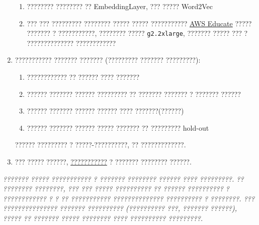 \documentclass[a4paper, 12pt]{article}
\begin{document}
\begin{enumerate}
\begin{enumerate}
            \item ???????? ???????? ?? EmbeddingLayer, ??? ????? Word2Vec
			\item ??? ??? ????????? ???????? ????? ????? ??????????? \href{https://aws.amazon.com/ru/education/awseducate/}{AWS Educate} ????? ??????? ? ???????????, ???????? ????? \texttt{g2.2xlarge}, ??????? ????? ??? ? ?????????????? ????????????
        \end{enumerate} 
        \item ??????????? ??????? ??????? (????????? ??????? ?????????):
        \begin{enumerate}
			\item ???????????? ?? ?????? ???? ???????
            \item ?????? ??????? ?????? ????????? ?? ??????? ??????? ? ??????? ??????
            \item ?????? ??????? ?????? ?????? ???? ???????(??????)
            \item ?????? ??????? ?????? ????? ??????? ?? ????????? hold-out
\end{enumerate}
?????? ????????? ? ?????-??????????, ?? ?????????????.
\item ??? ????? ??????, \href{http://www.slideshare.net/antongorokhov/bigdata-week-moscow-2013-case-personalization}{???????????} ? ??????? ???????? ??????. 
  \end{enumerate}
  
\vspace{1.2cm}
\emph{??????? ????? ??????????? ? ??????? ???????? ?????? ???? ?????????. ?? ???????? ????????, ??? ??? ????? ?????????? ?? ?????? ?????????? ? ???????????? ? ? ?? ??????????? ?????????????? ?????????? ? ????????. ??? ??????????????? ??????? ?????????? (?????????? ???, ??????? ??????), ????? ?? ??????? ????? ???????? ???? ?????????? ?????????.}
\end{document}
